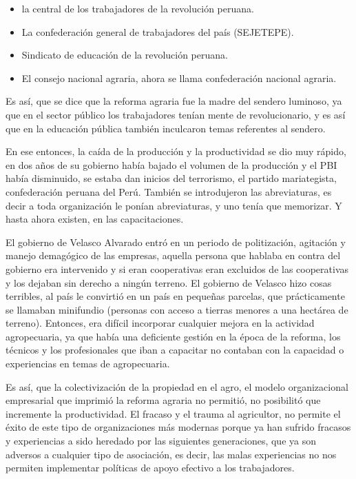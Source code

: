 \documentclass[
  letterpaper,
  DIV=11,
  numbers=noendperiod]{scrartcl}
\providecommand{\tightlist}{%
  \setlength{\itemsep}{0pt}\setlength{\parskip}{0pt}}\usepackage{longtable,booktabs,array}
\begin{document}
\begin{itemize}
\tightlist
\item
  la central de los trabajadores de la revolución peruana.
\item
  La confederación general de trabajadores del país (SEJETEPE).
\item
  Sindicato de educación de la revolución peruana.
\item
  El consejo nacional agraria, ahora se llama confederación nacional
  agraria.
\end{itemize}

Es así, que se dice que la reforma agraria fue la madre del sendero
luminoso, ya que en el sector público los trabajadores tenían mente de
revolucionario, y es así que en la educación pública también inculcaron
temas referentes al sendero.

En ese entonces, la caída de la producción y la productividad se dio muy
rápido, en dos años de su gobierno había bajado el volumen de la
producción y el PBI había disminuido, se estaba dan inicios del
terrorismo, el partido mariategista, confederación peruana del Perú.
También se introdujeron las abreviaturas, es decir a toda organización
le ponían abreviaturas, y uno tenía que memorizar. Y hasta ahora
existen, en las capacitaciones.

El gobierno de Velasco Alvarado entró en un periodo de politización,
agitación y manejo demagógico de las empresas, aquella persona que
hablaba en contra del gobierno era intervenido y si eran cooperativas
eran excluidos de las cooperativas y los dejaban sin derecho a ningún
terreno. El gobierno de Velasco hizo cosas terribles, al país le
convirtió en un país en pequeñas parcelas, que prácticamente se llamaban
minifundio (personas con acceso a tierras menores a una hectárea de
terreno). Entonces, era difícil incorporar cualquier mejora en la
actividad agropecuaria, ya que había una deficiente gestión en la época
de la reforma, los técnicos y los profesionales que iban a capacitar no
contaban con la capacidad o experiencias en temas de agropecuaria.

Es así, que la colectivización de la propiedad en el agro, el modelo
organizacional empresarial que imprimió la reforma agraria no permitió,
no posibilitó que incremente la productividad. El fracaso y el trauma al
agricultor, no permite el éxito de este tipo de organizaciones más
modernas porque ya han sufrido fracasos y experiencias a sido heredado
por las siguientes generaciones, que ya son adversos a cualquier tipo de
asociación, es decir, las malas experiencias no nos permiten implementar
políticas de apoyo efectivo a los trabajadores.
\end{document}
